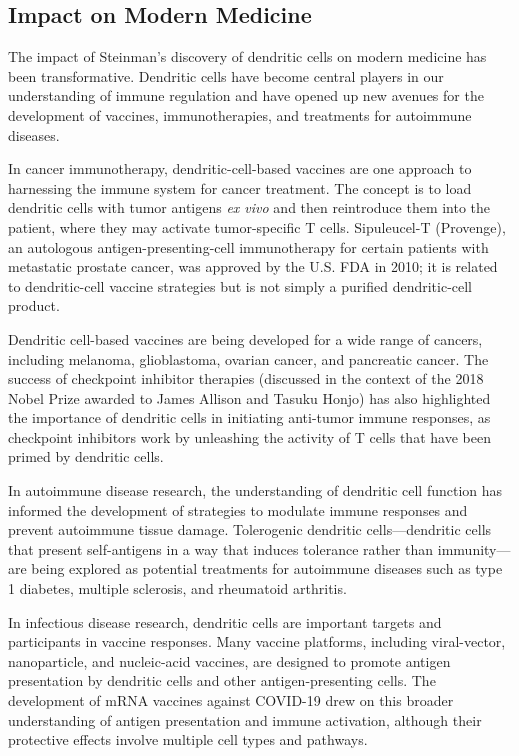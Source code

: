 \subsection{Impact on Modern Medicine}

The impact of Steinman's discovery of dendritic cells on modern medicine has been transformative. Dendritic cells have become central players in our understanding of immune regulation and have opened up new avenues for the development of vaccines, immunotherapies, and treatments for autoimmune diseases.

In cancer immunotherapy, dendritic-cell-based vaccines are one approach to harnessing the immune system for cancer treatment. The concept is to load dendritic cells with tumor antigens \textit{ex vivo} and then reintroduce them into the patient, where they may activate tumor-specific T cells. Sipuleucel-T (Provenge), an autologous antigen-presenting-cell immunotherapy for certain patients with metastatic prostate cancer, was approved by the U.S. FDA in 2010; it is related to dendritic-cell vaccine strategies but is not simply a purified dendritic-cell product.

Dendritic cell-based vaccines are being developed for a wide range of cancers, including melanoma, glioblastoma, ovarian cancer, and pancreatic cancer. The success of checkpoint inhibitor therapies (discussed in the context of the 2018 Nobel Prize awarded to James Allison and Tasuku Honjo) has also highlighted the importance of dendritic cells in initiating anti-tumor immune responses, as checkpoint inhibitors work by unleashing the activity of T cells that have been primed by dendritic cells.

In autoimmune disease research, the understanding of dendritic cell function has informed the development of strategies to modulate immune responses and prevent autoimmune tissue damage. Tolerogenic dendritic cells---dendritic cells that present self-antigens in a way that induces tolerance rather than immunity---are being explored as potential treatments for autoimmune diseases such as type 1 diabetes, multiple sclerosis, and rheumatoid arthritis.

In infectious disease research, dendritic cells are important targets and participants in vaccine responses. Many vaccine platforms, including viral-vector, nanoparticle, and nucleic-acid vaccines, are designed to promote antigen presentation by dendritic cells and other antigen-presenting cells. The development of mRNA vaccines against COVID-19 drew on this broader understanding of antigen presentation and immune activation, although their protective effects involve multiple cell types and pathways.

